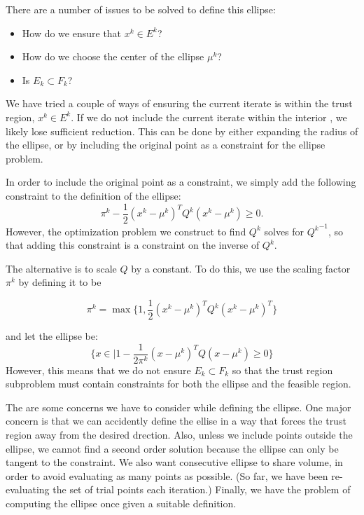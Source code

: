 \documentclass{article}
\begin{document}
There are a number of issues to be solved to define this ellipse:
\begin{itemize}
\item How do we ensure that $x^k \in E^k$?
\item How do we choose the center of the ellipse $\mu^k$?
\item Is $E_k \subset F_k$?
\end{itemize}

We have tried a couple of ways of ensuring the current iterate is within the trust region, $x^k \in E^k$.
If we do not include the current iterate \color{red} within the interior \color{black}, we likely lose sufficient reduction.
This can be done by either expanding the radius of the ellipse, or by including the original point as a constraint for the ellipse problem.


In order to include the original point as a constraint, we simply add the following constraint to the definition of the ellipse:
$$ \pi^k - \frac 1 2 (x^k - \mu^{k})^TQ^{k}(x^k - \mu^{k}) \ge 0. $$
However, the optimization problem we construct to find $Q^k$ solves for ${Q^k}^{-1}$, so that adding this constraint is a constraint on the inverse of $Q^k$.





The alternative is to scale $Q$ by a constant.
To do this, we use the scaling factor $\pi^k$ by defining it to be

$$\pi^k = \max \{1, \frac 1 {2} (x^{k} - \mu^{k})^T Q^k (x^{k} - \mu^{k})^T \}$$

and let the ellipse be:
$$\{x \in \mathbb | 1 - \frac 1 {2\pi^k} (x - \mu^{k})^T Q (x - \mu^{k}) \ge 0\} $$
However, this means that we do not ensure $E_k \subset F_k$ so that the trust region subproblem must contain constraints for both the ellipse and the feasible region.


The are some concerns we have to consider while defining the ellipse.
One major concern is that we can accidently define the ellise in a way that forces the trust region away from the desired drection.
Also, unless we include points outside the ellipse, we cannot find a second order solution because the ellipse can only be tangent to the constraint.
We also want consecutive ellipse to share volume, in order to avoid evaluating as many points as possible.
(So far, we have been re-evaluating the set of trial points each iteration.)
Finally, we have the problem of computing the ellipse once given a suitable definition.
\end{document}
